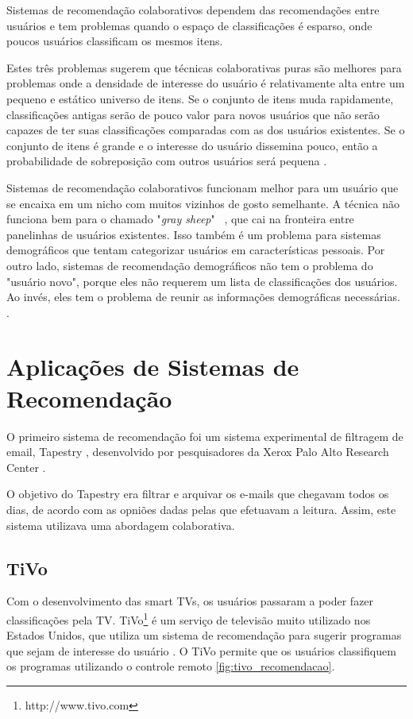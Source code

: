 Sistemas de recomendação colaborativos dependem das recomendações entre usuários e tem problemas quando o espaço de classificações é esparso, onde poucos usuários classificam os mesmos itens.

Estes três problemas sugerem que técnicas colaborativas puras são melhores para problemas onde a densidade de interesse do usuário é relativamente alta entre um pequeno e estático universo de itens. Se o conjunto de itens muda rapidamente, classificações antigas serão de pouco valor para novos usuários que não serão capazes de ter suas classificações comparadas com as dos usuários existentes. Se o conjunto de itens é grande e o interesse do usuário dissemina pouco, então a probabilidade de sobreposição com outros usuários será pequena \citep{Burke:2002:HRS:586321.586352}.

Sistemas de recomendação colaborativos funcionam melhor para um usuário que se encaixa em um nicho com muitos vizinhos de gosto semelhante. A técnica não funciona bem para o chamado "\textit{gray sheep}"~ \citep{claypool99}, que cai na fronteira entre panelinhas de usuários existentes. Isso também é um problema para sistemas demográficos que tentam categorizar usuários em características pessoais. Por outro lado, sistemas de recomendação demográficos não tem o problema do "usuário novo", porque eles não requerem um lista de classificações dos usuários. Ao invés, eles tem o problema de reunir as informações demográficas necessárias. \citep{Burke:2002:HRS:586321.586352}.

\section{Aplicações de Sistemas de Recomendação}

O primeiro sistema de recomendação foi um sistema experimental de filtragem de email, Tapestry \citep{goldberg1992tapestry}, desenvolvido por pesquisadores da Xerox Palo Alto Research Center \citep{Resnick:1997:RS:245108.245121}.

O objetivo do Tapestry era filtrar e arquivar os e-mails que chegavam todos os dias, de acordo com as opniões dadas pelas que efetuavam a leitura. Assim, este sistema utilizava uma abordagem colaborativa.

\subsection{TiVo}

Com o desenvolvimento das smart TVs, os usuários passaram a poder fazer classificações pela TV. TiVo\footnote{http://www.tivo.com} é um serviço de televisão muito utilizado nos Estados Unidos, que utiliza um sistema de recomendação para sugerir programas que sejam de interesse do usuário \citep{Ali:2004:TMS:1014052.1014097}. O TiVo permite que os usuários classifiquem os programas utilizando o controle remoto \ref{fig:tivo_recomendacao}.

